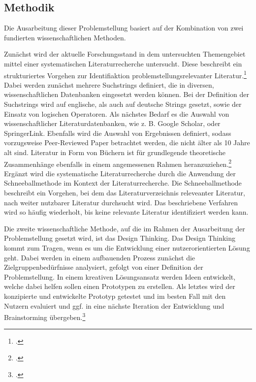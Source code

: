 \subsection{Methodik}
Die Ausarbeitung dieser Problemstellung basiert auf der Kombination von zwei fundierten wissenschaftlichen Methoden.

Zunächst wird der aktuelle Forschungsstand in dem untersuchten Themengebiet mittel einer systematischen Literaturrecherche untersucht.
Diese beschreibt ein strukturiertes Vorgehen zur Identifiaktion problemstellungsrelevanter Literatur.\footcite{brocke2015standing}
Dabei werden zunächst mehrere Suchstrings definiert, die in diversen, wissenschaftlichen Datenbanken eingesetzt werden können.
Bei der Definition der Suchstrings wird auf englische, als auch auf deutsche Strings gesetzt, sowie der Einsatz von logischen Operatoren.
Als nächstes Bedarf es die Auswahl von wissenschaftlicher Literaturdatenbanken, wie z. B. Google Scholar, oder SpringerLink.
Ebenfalls wird die Auswahl von Ergebnissen definiert, sodass vorzugsweise Peer-Reviewed Paper betrachtet werden, die nicht älter als 10 Jahre alt sind.
Literatur in Form von Büchern ist für grundlegende theoretische Zusammenhänge ebenfalls in einem angemessenen Rahmen heranzuziehen.\footcite{xiao2019guidance}
Ergänzt wird die systematische Literaturrecherche durch die Anwendung der Schneeballmethode im Kontext der Literaturrecherche.
Die Schneeballmethode beschreibt ein Vorgehen, bei dem das Literaturverzeichnis releveanter Literatur, nach weiter nutzbarer Literatur durchsucht wird.
Das beschriebene Verfahren wird so häufig wiederholt, bis keine relevante Literatur identifiziert werden kann.

Die zweite wissenschaftliche Methode, auf die im Rahmen der Ausarbeitung der Problemstellung gesetzt wird, ist das Design Thinking.
Das Design Thinking kommt zum Tragen, wenn es um die Entwicklung einer nutzerorientierten Lösung geht.
Dabei werden in einem aufbauenden Prozess zunächst die Zielgruppenbedürfnisse analysiert, gefolgt von einer Definition der Problemstellung.
In einem kreativen Lösungsansatz werden Ideen entwickelt, welche dabei helfen sollen einen Prototypen zu erstellen.
Als letztes wird der konzipierte und entwickelte Prototyp getestet und im besten Fall mit den Nutzern evaluiert und ggf. in eine nächste Iteration der Entwicklung und Brainstorming übergeben.\footcite{heller2020design}